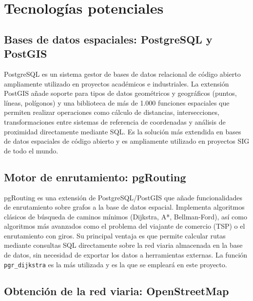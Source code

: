 \section{Tecnologías potenciales}
\label{sec:tecnologias}

\subsection{Bases de datos espaciales: PostgreSQL y PostGIS}
\label{subsec:postgis}

PostgreSQL es un sistema gestor de bases de datos relacional de código abierto ampliamente utilizado en proyectos académicos e industriales. La extensión PostGIS \cite{obehsu2015} añade soporte para tipos de datos geométricos y geográficos (puntos, líneas, polígonos) y una biblioteca de más de 1.000 funciones espaciales que permiten realizar operaciones como cálculo de distancias, intersecciones, transformaciones entre sistemas de referencia de coordenadas y análisis de proximidad directamente mediante SQL. Es la solución más extendida en bases de datos espaciales de código abierto y es ampliamente utilizado en proyectos SIG de todo el mundo.

\subsection{Motor de enrutamiento: pgRouting}
\label{subsec:pgrouting}

pgRouting \cite{obehsu2017} es una extensión de PostgreSQL/PostGIS que añade funcionalidades de enrutamiento sobre grafos a la base de datos espacial. Implementa algoritmos clásicos de búsqueda de caminos mínimos (Dijkstra, A*, Bellman-Ford), así como algoritmos más avanzados como el problema del viajante de comercio (TSP) o el enrutamiento con giros. Su principal ventaja es que permite calcular rutas mediante consultas SQL directamente sobre la red viaria almacenada en la base de datos, sin necesidad de exportar los datos a herramientas externas. La función \texttt{pgr\_dijkstra} es la más utilizada y es la que se empleará en este proyecto.

\subsection{Obtención de la red viaria: OpenStreetMap}
\label{subsec:osm}

